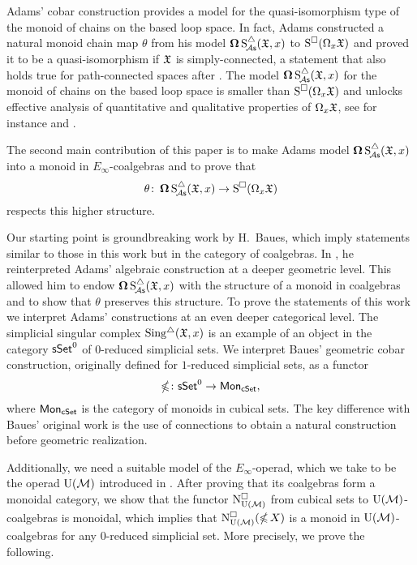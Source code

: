 Adams' cobar construction provides a model for the quasi-isomorphism type of the monoid of chains on the based loop space. In fact, Adams constructed a natural monoid chain map $\theta$ from his model $\operatorname{\mathbf{\Omega}} \operatorname{S^{\triangle}_{\!{\mathcal{A}\mathsf{s}}}}(\mathfrak{X}, x)$ to $\operatorname{S^{\square}}(\Omega_x \mathfrak{X})$ and proved it to be a quasi-isomorphism if $\mathfrak{X}$ is simply-connected, a statement that also holds true for path-connected spaces after \cite{rivera2018cubical}. The model $\operatorname{\mathbf{\Omega}} \operatorname{S^{\triangle}_{\!{\mathcal{A}\mathsf{s}}}}(\mathfrak{X}, x)$ for the monoid of chains on the based loop space is smaller than $\operatorname{S^{\square}}(\Omega_x \mathfrak{X})$ and unlocks effective analysis of quantitative and qualitative properties of $\Omega_x \mathfrak{X}$, see for instance \cite{chainalgebraloops} and \cite{adamscobarequivalence}. 

The second main contribution of this paper is to make Adams model $\operatorname{\mathbf{\Omega}} \operatorname{S^{\triangle}_{\!{\mathcal{A}\mathsf{s}}}}(\mathfrak{X}, x)$ into a monoid in $E_\infty$-coalgebras and to prove that
\[
\theta \colon \operatorname{\mathbf{\Omega}} \operatorname{S^{\triangle}_{\!{\mathcal{A}\mathsf{s}}}}(\mathfrak{X}, x) \to \operatorname{S^{\square}}(\Omega_x \mathfrak{X})
\]
respects this higher structure.

Our starting point is groundbreaking work by H.~Baues, which imply statements similar to those in this work but in the category of coalgebras.
In \cite{baues1998hopf}, he reinterpreted Adams' algebraic construction at a deeper geometric level.
This allowed him to endow $\operatorname{\mathbf{\Omega}} \operatorname{S^{\triangle}_{\!{\mathcal{A}\mathsf{s}}}}(\mathfrak{X}, x)$ with the structure of a monoid in coalgebras and to show that $\theta$ preserves this structure.
To prove the statements of this work we interpret Adams' constructions at an even deeper categorical level.
The simplicial singular complex $\operatorname{Sing^{\triangle}}(\mathfrak{X}, x)$ is an example of an object in the category $\mathsf{sSet}^0$ of $0$-reduced simplicial sets.
We interpret Baues' geometric cobar construction, originally defined for $1$-reduced simplicial sets, as a functor
\begin{equation*}
	\operatorname{\mathbb{\Omega}} \colon \mathsf{sSet}^0 \to \mathsf{Mon}_{\mathsf{cSet}},
\end{equation*}
where $\mathsf{Mon}_{\mathsf{cSet}}$ is the category of monoids in cubical sets.
The key difference with Baues' original work is the use of connections to obtain a natural construction before geometric realization.

Additionally, we need a suitable model of the $E_\infty$-operad, which we take to be the operad ${\operatorname{U}(\mathcal{M})}$ introduced in \cite{medina2020prop1}.
After proving that its coalgebras form a monoidal category, we show that the functor $\operatorname{N^{\square}_{{\operatorname{U}(\mathcal{M})}}}$ from cubical sets to ${\operatorname{U}(\mathcal{M})}$-coalgebras is monoidal, which implies that $\operatorname{N^{\square}_{{\operatorname{U}(\mathcal{M})}}} (\operatorname{\mathbb{\Omega}} X)$ is a monoid in ${\operatorname{U}(\mathcal{M})}$-coalgebras for any 0-reduced simplicial set. More precisely, we prove the following.

